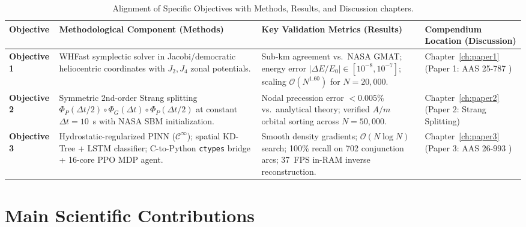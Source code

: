 \begin{table}[htbp]
\centering
\caption{Alignment of Specific Objectives with Methods, Results, and Discussion chapters.}
\label{tab:objective_alignment}
\footnotesize
\begin{tabularx}{\textwidth}{l X X l}
\toprule
\textbf{Objective} & \textbf{Methodological Component (Methods)} & \textbf{Key Validation Metrics (Results)} & \textbf{Compendium Location (Discussion)} \\
\midrule
\textbf{Objective 1} & WHFast symplectic solver in Jacobi/democratic heliocentric coordinates with $J_2, J_4$ zonal potentials. & Sub-km agreement vs.\ NASA GMAT; energy error $|\Delta E/E_0| \in [10^{-8}, 10^{-7}]$; scaling $\mathcal{O}(N^{1.60})$ for $N = 20,000$. & Chapter~\ref{ch:paper1} (Paper 1: AAS 25-787 \cite{puerta-ibarra_aas25_2025}) \\
\addlinespace
\textbf{Objective 2} & Symmetric 2nd-order Strang splitting $\Phi_P(\Delta t/2) \circ \Phi_G(\Delta t) \circ \Phi_P(\Delta t/2)$ at constant $\Delta t = 10$~s with NASA SBM initialization. & Nodal precession error $< 0.005\%$ vs.\ analytical theory; verified $A/m$ orbital sorting across $N = 50,000$. & Chapter~\ref{ch:paper2} (Paper 2: Strang Splitting) \\
\addlinespace
\textbf{Objective 3} & Hydrostatic-regularized PINN ($\mathcal{C}^\infty$); spatial KD-Tree + LSTM classifier; C-to-Python \texttt{ctypes} bridge + 16-core PPO MDP agent. & Smooth density gradients; $\mathcal{O}(N \log N)$ search; 100\% recall on 702 conjunction arcs; 37~FPS in-RAM inverse reconstruction. & Chapter~\ref{ch:paper3} (Paper 3: AAS 26-993 \cite{puerta-ibarra_aas26_2026}) \\
\bottomrule
\end{tabularx}
\end{table}

\section{Main Scientific Contributions}
\label{sec:contributions}


